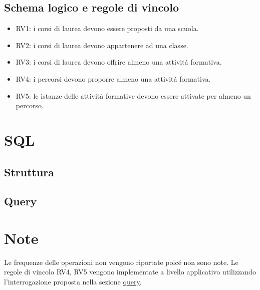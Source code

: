 \documentclass[a4paper,12pt,italian,towside]{article}
\begin{document}
\subsection{Schema logico e regole di vincolo}

\begin{itemize}
	\item RV1: i corsi di laurea devono essere proposti da una scuola.
	\item RV2: i corsi di laurea devono appartenere ad una classe.
	\item RV3: i corsi di laurea devono offrire almeno una attivit\'a formativa.
	\item RV4: i percorsi devono proporre almeno una attivit\'a formativa.
	\item RV5: le istanze delle attivit\'a formative devono essere attivate per almeno un percorso.
\end{itemize}

\newpage
\section{SQL}



\subsection{Struttura}



\subsection{Query}
\label{sql:query}


\newpage

\section{Note}

Le frequenze delle operazioni non vengono riportate poic\'e non sono note.
Le regole di vincolo RV4, RV5 vengono implementate a livello applicativo utilizzando l'interrogazione proposta nella sezione \hyperref[sql:query]{query}.


%
%

\end{document}
